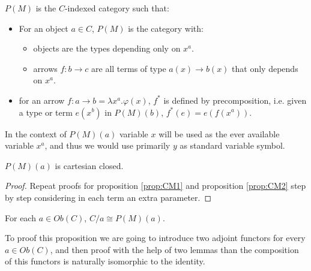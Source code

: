 \begin{definition} $P(M)$ is the $C$-indexed category such that:
  \begin{itemize}
  \item For an object $a\in C$, $P(M)$ is the category with:
    \begin{itemize}
    \item objects are the types depending only on $x^a$.
    \item arrows $f: b\to c$ are all terms of type $a(x)\to b(x)$ that only depends on $x^a$.
    \end{itemize}
  \item for an arrow $f:a\to b = \lambda x^a.\varphi(x)$, $f^*$ is defined by precomposition, i.e. given a type or term $e(x^b)$ in $P(M)(b)$, $f^*(e) = e(f(x^a))$.  
  \end{itemize}
\end{definition}

\begin{remark}
  In the context of $P(M)(a)$ variable $x$ will be used as the ever available variable $x^a$, and thus we would use primarily $y$ as standard variable symbol.
\end{remark}
\begin{proposition}
$P(M)(a)$ is cartesian closed.
\end{proposition}
\begin{proof}
  Repeat proofs for proposition \ref{prop:CM1} and proposition \ref{prop:CM2} step by step considering in each term an extra parameter.
\end{proof}


\begin{proposition}\label{lemma:hyperdoc}
For each $a\in Ob(C)$, $C/a\cong P(M)(a)$.
\end{proposition}

To proof this proposition we are going to introduce two adjoint functors for every $a\in Ob(C)$, and then proof with the help of two lemmas than the composition of this functors is naturally isomorphic to the identity.

